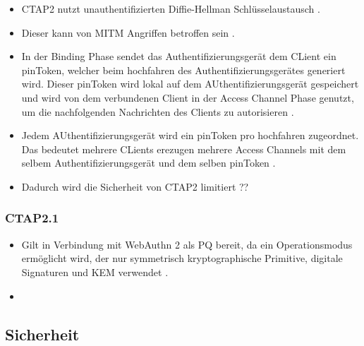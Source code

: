 \begin{itemize}
    \item \ac{CTAP2} nutzt unauthentifizierten Diffie-Hellman Schlüsselaustausch \cite{barbosa2021provable}.
    \item Dieser kann von \ac{MITM} Angriffen betroffen sein \cite{barbosa2021provable}.
    \item In der Binding Phase sendet das Authentifizierungsgerät dem CLient ein pinToken, welcher beim hochfahren des Authentifizierungsgerätes generiert wird. Dieser pinToken wird lokal auf dem AUthentifizierungsgerät gespeichert und wird von dem verbundenen Client in der Access Channel Phase genutzt, um die nachfolgenden Nachrichten des Clients zu autorisieren \cite{barbosa2021provable}.
    \item Jedem AUthentifizierungsgerät wird ein pinToken pro hochfahren zugeordnet. Das bedeutet mehrere CLients erezugen mehrere Access Channels mit dem selbem Authentifizierungsgerät und dem selben pinToken \cite{barbosa2021provable}.
    \item Dadurch wird die Sicherheit von \ac{CTAP2} limitiert ??
\end{itemize}

\subsubsection{CTAP2.1}
\begin{itemize}
    \item Gilt in Verbindung mit WebAuthn 2 als \ac{PQ} bereit, da ein Operationsmodus ermöglicht wird, der nur symmetrisch kryptographische Primitive, digitale Signaturen und \ac{KEM} verwendet \cite{bindel2022fido2}.
    \item 
\end{itemize}

\subsection{Sicherheit}


